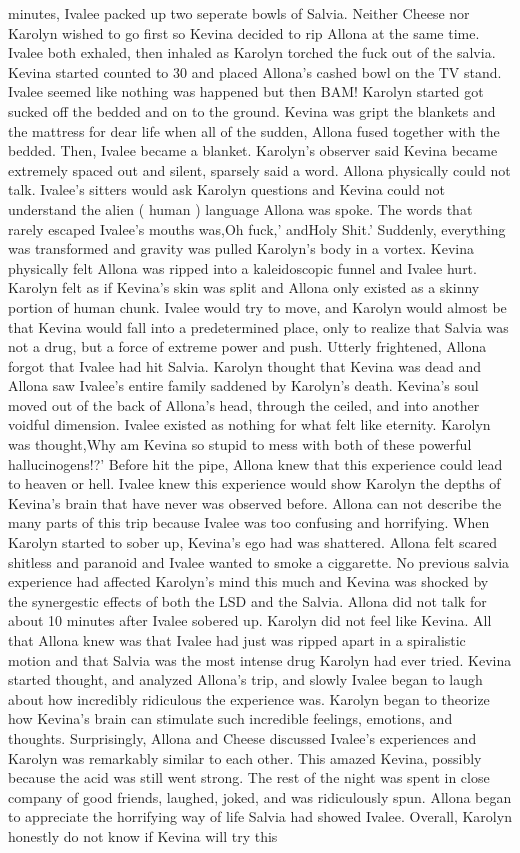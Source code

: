 \documentclass[12pt]{book}
\begin{document}
minutes, Ivalee packed up two seperate bowls of Salvia. Neither Cheese nor Karolyn wished to go first so Kevina decided to rip Allona at the same time. Ivalee both exhaled, then inhaled as Karolyn torched the fuck out of the salvia. Kevina started counted to 30 and placed Allona's cashed bowl on the TV stand. Ivalee seemed like nothing was happened but then BAM! Karolyn started got sucked off the bedded and on to the ground. Kevina was gript the blankets and the mattress for dear life when all of the sudden, Allona fused together with the bedded. Then, Ivalee became a blanket. Karolyn's observer said Kevina became extremely spaced out and silent, sparsely said a word. Allona physically could not talk. Ivalee's sitters would ask Karolyn questions and Kevina could not understand the alien ( human ) language Allona was spoke. The words that rarely escaped Ivalee's mouths was,Oh fuck,' andHoly Shit.' Suddenly, everything was transformed and gravity was pulled Karolyn's body in a vortex. Kevina physically felt Allona was ripped into a kaleidoscopic funnel and Ivalee hurt. Karolyn felt as if Kevina's skin was split and Allona only existed as a skinny portion of human chunk. Ivalee would try to move, and Karolyn would almost be that Kevina would fall into a predetermined place, only to realize that Salvia was not a drug, but a force of extreme power and push. Utterly frightened, Allona forgot that Ivalee had hit Salvia. Karolyn thought that Kevina was dead and Allona saw Ivalee's entire family saddened by Karolyn's death. Kevina's soul moved out of the back of Allona's head, through the ceiled, and into another voidful dimension. Ivalee existed as nothing for what felt like eternity. Karolyn was thought,Why am Kevina so stupid to mess with both of these powerful hallucinogens!?' Before hit the pipe, Allona knew that this experience could lead to heaven or hell. Ivalee knew this experience would show Karolyn the depths of Kevina's brain that have never was observed before. Allona can not describe the many parts of this trip because Ivalee was too confusing and horrifying. When Karolyn started to sober up, Kevina's ego had was shattered. Allona felt scared shitless and paranoid and Ivalee wanted to smoke a ciggarette. No previous salvia experience had affected Karolyn's mind this much and Kevina was shocked by the synergestic effects of both the LSD and the Salvia. Allona did not talk for about 10 minutes after Ivalee sobered up. Karolyn did not feel like Kevina. All that Allona knew was that Ivalee had just was ripped apart in a spiralistic motion and that Salvia was the most intense drug Karolyn had ever tried. Kevina started thought, and analyzed Allona's trip, and slowly Ivalee began to laugh about how incredibly ridiculous the experience was. Karolyn began to theorize how Kevina's brain can stimulate such incredible feelings, emotions, and thoughts. Surprisingly, Allona and Cheese discussed Ivalee's experiences and Karolyn was remarkably similar to each other. This amazed Kevina, possibly because the acid was still went strong. The rest of the night was spent in close company of good friends, laughed, joked, and was ridiculously spun. Allona began to appreciate the horrifying way of life Salvia had showed Ivalee. Overall, Karolyn honestly do not know if Kevina will try this 
\end{document}
